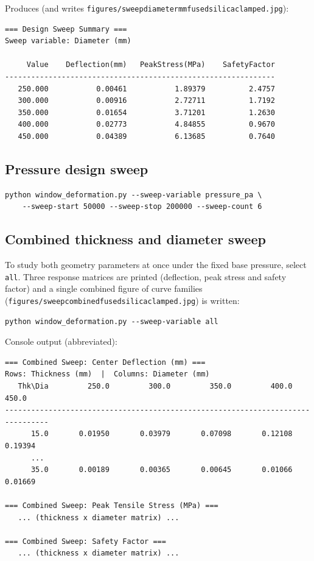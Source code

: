\documentclass[11pt]{article}
\newcommand{\codeus}{\textunderscore\allowbreak}
\DeclareRobustCommand{\code}[1]{\texttt{\ifmmode\else\renewcommand{\_}{\codeus}\fi#1}}
\begin{document}
\noindent Produces (and writes \code{figures/sweep\_diameter\_mm\_fused\_silica\_clamped.jpg}):

\begin{lstlisting}[style=shellstyle]
=== Design Sweep Summary ===
Sweep variable: Diameter (mm)

     Value    Deflection(mm)   PeakStress(MPa)    SafetyFactor
--------------------------------------------------------------
   250.000           0.00461           1.89379          2.4757
   300.000           0.00916           2.72711          1.7192
   350.000           0.01654           3.71201          1.2630
   400.000           0.02773           4.84855          0.9670
   450.000           0.04389           6.13685          0.7640
\end{lstlisting}

\subsection{Pressure design sweep}

\begin{lstlisting}[style=shellstyle]
python window_deformation.py --sweep-variable pressure_pa \
    --sweep-start 50000 --sweep-stop 200000 --sweep-count 6
\end{lstlisting}

\subsection{Combined thickness and diameter sweep}

To study both geometry parameters at once under the fixed base pressure, select
\code{all}. Three response matrices are printed (deflection, peak stress and
safety factor) and a single combined figure of curve families
(\code{figures/sweep\_combined\_fused\_silica\_clamped.jpg}) is written:

\begin{lstlisting}[style=shellstyle]
python window_deformation.py --sweep-variable all
\end{lstlisting}

\noindent Console output (abbreviated):

\begin{lstlisting}[style=shellstyle, basicstyle=\ttfamily\footnotesize]
=== Combined Sweep: Center Deflection (mm) ===
Rows: Thickness (mm)  |  Columns: Diameter (mm)
   Thk\Dia         250.0         300.0         350.0         400.0         450.0
--------------------------------------------------------------------------------
      15.0       0.01950       0.03979       0.07098       0.12108       0.19394
      ...
      35.0       0.00189       0.00365       0.00645       0.01066       0.01669

=== Combined Sweep: Peak Tensile Stress (MPa) ===
   ... (thickness x diameter matrix) ...

=== Combined Sweep: Safety Factor ===
   ... (thickness x diameter matrix) ...
\end{lstlisting}
\end{document}
